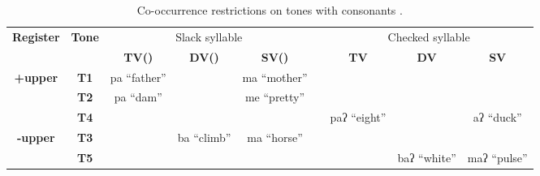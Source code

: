 \begin{table}[h!]
	\centering
	\begin{tabular}{ccccccccc}
		\toprule
		\multirow{2}{*}{\textbf{Register}} & \multirow{2}{*}{\textbf{Tone}} 
		& \multicolumn{3}{c}{Slack syllable} & & \multicolumn{3}{c}{Checked syllable} \\ 
		\cmidrule{3-5}\cmidrule{7-9}
		&  & \textbf{TV(\ng)} & \textbf{DV(\ng)} & \textbf{SV(\ng)} & & \textbf{TV\textglotstop} & \textbf{DV\textglotstop} & \textbf{SV\textglotstop} \\
		\midrule
		\multirow{3}{*}{\textbf{+upper}} 
		& \textbf{T1} & pa ``father'' & \texttimes & ma ``mother'' & & \texttimes & \texttimes & \texttimes \\
		& \textbf{T2} & pa ``dam''    & \texttimes & me ``pretty'' & & \texttimes & \texttimes & \texttimes \\
		& \textbf{T4} & \texttimes & \texttimes & \texttimes & & paʔ ``eight'' & \texttimes & aʔ ``duck'' \\
		\midrule
		\multirow{2}{*}{\textbf{-upper}} 
		& \textbf{T3} & \texttimes & ba ``climb'' & ma ``horse'' & & \texttimes & \texttimes & \texttimes \\
		& \textbf{T5} & \texttimes & \texttimes & \texttimes & & \texttimes & baʔ ``white'' & maʔ ``pulse'' \\
		\bottomrule
	\end{tabular}
	\caption{Co-occurrence restrictions on tones with consonants \citep{chen2015shanghai}.}
	\label{tab:shanghai}
\end{table}